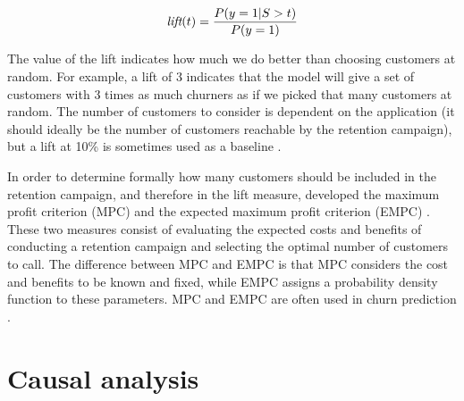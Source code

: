 \[\textit{lift}(t) = \frac{P(y=1|S>t)}{P(y=1)}\]

The value of the lift indicates how much we do better than choosing customers at
random. For example, a lift of 3 indicates that the model will give a set of
customers with 3 times as much churners as if we picked that many customers at
random. The number of customers to consider is dependent on the application (it
should ideally be the number of customers reachable by the retention campaign),
but a lift at 10\% is sometimes used as a baseline \parencite{zhu2017empirical,
verbeke2014social}.

In order to determine formally how many customers should be included in the
retention campaign, and therefore in the lift measure, \textcite{verbeke2012new}
developed the maximum profit criterion (MPC) and the expected maximum profit
criterion (EMPC) \parencite{verbeke2012new, verbraken2013novel}. These two
measures consist of evaluating the expected costs and benefits of conducting a
retention campaign and selecting the optimal number of customers to call. The
difference between MPC and EMPC is that MPC considers the cost and benefits to
be known and fixed, while EMPC assigns a probability density function to these
parameters. MPC and EMPC are often used in churn prediction
\parencite{zhu2017empirical, oskarsdottir2018time, stripling2018profit}.

\section{Causal analysis}
\label{sec:sota_caus}

